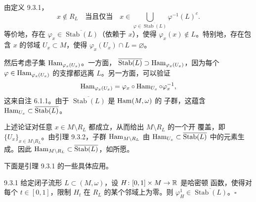 
\begin{wproof}[引理 9.3.1 的证明]
  由定义 9.3.1，
  \begin{equation*}
    x\notin R_L\quad\text{当且仅当}\quad
    x\in\bigcup_{\varphi\in\overline{\operatorname{Stab}(L)}}\varphi^{-1}(L)^c.
  \end{equation*}
  等价地，存在 $\varphi_x\in\overline{\operatorname{Stab}(L)}$（依赖于 $x$），使得
  $\varphi_x(x)\notin L$。特别地，存在包含 $x$ 的邻域 $U_x\subset M$，使得
  $\varphi_x(U_x)\cap L=\varnothing$。

  然后考虑子集 $\operatorname{Ham}_{\varphi_x(U_x)}$。一方面，
  $\overline{\operatorname{Stab}(L)}\supset\operatorname{Ham}_{\varphi_x(U_x)}$，因为每个
  $\varphi\in\operatorname{Ham}_{\varphi_x(U_x)}$ 的支撑都远离 $L$。另一方面，可以验证
  \begin{equation*}
    \operatorname{Ham}_{\varphi_x(U_x)}=\varphi_x\circ\operatorname{Ham}_{U_x}\circ\varphi_x^{-1},
  \end{equation*}
  这来自注 6.1.1。由于 $\overline{\operatorname{Stab}(L)}$ 是 $\operatorname{Ham}(M,\omega)$ 的
  子群，这蕴含 $\operatorname{Ham}_{U_x}\subset\overline{\operatorname{Stab}(L)}$。

  上述论证对任意 $x\in M\setminus R_L$ 都成立，从而给出 $M\setminus R_L$ 的一个开
  覆盖，即 $\{U_x\}_{x\in M\setminus R_L}$。由引理 9.3.2，子群
  $\operatorname{Ham}_{M\setminus R_L}$ 由 $\operatorname{Ham}_{U_x}\subset\overline{\operatorname{Stab}(L)}$
  中的元素生成。因此 $\operatorname{Ham}_{M\setminus R_L}\subset
  \overline{\operatorname{Stab}(L)}$，如所愿。
\end{wproof}

下面是引理 9.3.1 的一些具体应用。

\begin{wexam}{9.3.1}
  给定闭子流形 $L\subset(M,\omega)$，设 $H\colon[0,1]\times M\to\mathbb{R}$ 是哈密顿
  函数，使得对每个 $t\in[0,1]$，限制 $H_t$ 在 $R_L$ 的某个邻域上为零。则
  $\varphi_H^1\in\overline{\operatorname{Stab}(L)}$。\hfill$\square$
\end{wexam}

